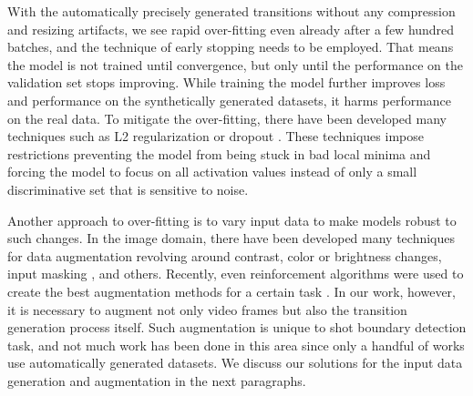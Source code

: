 With the automatically precisely generated transitions without any compression and resizing artifacts, we see rapid over-fitting even already after a few hundred batches, and the technique of early stopping needs to be employed. That means the model is not trained until convergence, but only until the performance on the validation set stops improving. While training the model further improves loss and performance on the synthetically generated datasets, it harms performance on the real data. To mitigate the over-fitting, there have been developed many techniques such as L2 regularization or dropout \cite{dropout}. These techniques impose restrictions preventing the model from being stuck in bad local minima and forcing the model to focus on all activation values instead of only a small discriminative set that is sensitive to noise.

Another approach to over-fitting is to vary input data to make models robust to such changes. In the image domain, there have been developed many techniques for data augmentation revolving around contrast, color or brightness changes, input masking \cite{cutout}, and others. Recently, even reinforcement algorithms were used to create the best augmentation methods for a certain task \cite{autoaugment}. In our work, however, it is necessary to augment not only video frames but also the transition generation process itself. Such augmentation is unique to shot boundary detection task, and not much work has been done in this area since only a handful of works use automatically generated datasets. We discuss our solutions for the input data generation and augmentation in the next paragraphs.




